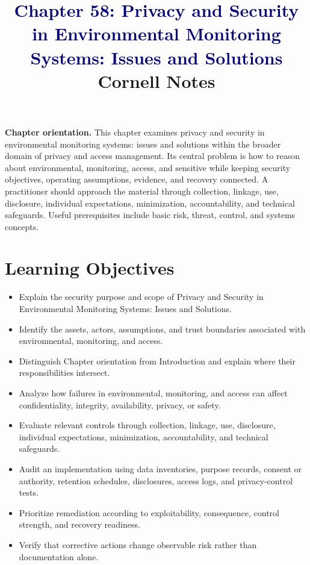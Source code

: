 \documentclass[11pt]{article}
\title{\textcolor{Navy}{Chapter 58: Privacy and Security in Environmental Monitoring Systems: Issues and Solutions}\\[2mm]\large Cornell Notes}
\author{}
\date{}
\begin{document}
\maketitle
\thispagestyle{fancy}
\vspace{-1.5em}
\begin{orientationbox}
\textbf{Chapter orientation.} This chapter examines privacy and security in environmental monitoring systems: issues and solutions within the broader domain of privacy and access management. Its central problem is how to reason about environmental, monitoring, access, and sensitive while keeping security objectives, operating assumptions, evidence, and recovery connected. A practitioner should approach the material through collection, linkage, use, disclosure, individual expectations, minimization, accountability, and technical safeguards. Useful prerequisites include basic risk, threat, control, and systems concepts.
\end{orientationbox}
\section*{Learning Objectives}
\begin{itemize}
\item Explain the security purpose and scope of Privacy and Security in Environmental Monitoring Systems: Issues and Solutions.
\item Identify the assets, actors, assumptions, and trust boundaries associated with environmental, monitoring, and access.
\item Distinguish Chapter orientation from Introduction and explain where their responsibilities intersect.
\item Analyze how failures in environmental, monitoring, and access can affect confidentiality, integrity, availability, privacy, or safety.
\item Evaluate relevant controls through collection, linkage, use, disclosure, individual expectations, minimization, accountability, and technical safeguards.
\item Audit an implementation using data inventories, purpose records, consent or authority, retention schedules, disclosures, access logs, and privacy-control tests.
\item Prioritize remediation according to exploitability, consequence, control strength, and recovery readiness.
\item Verify that corrective actions change observable risk rather than documentation alone.
\end{itemize}
\end{document}
